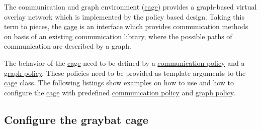 The communication and graph environment (\hyperlink{structgraybat_1_1Cage}{cage}) provides a graph-\/based virtual overlay network which is implemented by the policy based design. Taking this term to pieces, the \hyperlink{structgraybat_1_1Cage}{cage} is an interface which provides communication methods on basis of an existing communication library, where the possible paths of communication are described by a graph.

The behavior of the \hyperlink{structgraybat_1_1Cage}{cage} need to be defined by a \hyperlink{communicationPolicy}{communication policy} and a \hyperlink{graphPolicy}{graph policy}. These policies need to be provided as template arguments to the \hyperlink{structgraybat_1_1Cage}{cage} class. The following listings show examples on how to use and how to configure the \hyperlink{structgraybat_1_1Cage}{cage} with predefined \hyperlink{communicationPolicy}{communication policy} and \hyperlink{graphPolicy}{graph policy}.

\subsection*{Configure the graybat cage}


